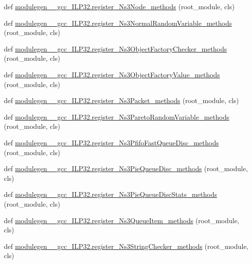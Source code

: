 \begin{DoxyCompactItemize}
\item 
def \hyperlink{namespacemodulegen____gcc__ILP32_a2500f4dcd70d582b086c6ce23502e83c}{modulegen\+\_\+\+\_\+gcc\+\_\+\+I\+L\+P32.\+register\+\_\+\+Ns3\+Node\+\_\+methods} (root\+\_\+module, cls)
\item 
def \hyperlink{namespacemodulegen____gcc__ILP32_a19dba5e985f333f3aaf4f9a23c36edad}{modulegen\+\_\+\+\_\+gcc\+\_\+\+I\+L\+P32.\+register\+\_\+\+Ns3\+Normal\+Random\+Variable\+\_\+methods} (root\+\_\+module, cls)
\item 
def \hyperlink{namespacemodulegen____gcc__ILP32_aee073757310c9de4d2861b5c4b4eee5c}{modulegen\+\_\+\+\_\+gcc\+\_\+\+I\+L\+P32.\+register\+\_\+\+Ns3\+Object\+Factory\+Checker\+\_\+methods} (root\+\_\+module, cls)
\item 
def \hyperlink{namespacemodulegen____gcc__ILP32_a7505caf7d909001e889b89ce94143f4a}{modulegen\+\_\+\+\_\+gcc\+\_\+\+I\+L\+P32.\+register\+\_\+\+Ns3\+Object\+Factory\+Value\+\_\+methods} (root\+\_\+module, cls)
\item 
def \hyperlink{namespacemodulegen____gcc__ILP32_ac954ddbcc06ada408c4168d841f1ac53}{modulegen\+\_\+\+\_\+gcc\+\_\+\+I\+L\+P32.\+register\+\_\+\+Ns3\+Packet\+\_\+methods} (root\+\_\+module, cls)
\item 
def \hyperlink{namespacemodulegen____gcc__ILP32_aeeb1ab9a764c8ee20760d96f553b05e6}{modulegen\+\_\+\+\_\+gcc\+\_\+\+I\+L\+P32.\+register\+\_\+\+Ns3\+Pareto\+Random\+Variable\+\_\+methods} (root\+\_\+module, cls)
\item 
def \hyperlink{namespacemodulegen____gcc__ILP32_aba73bf49253e822f77f5cb8ec55a6fc2}{modulegen\+\_\+\+\_\+gcc\+\_\+\+I\+L\+P32.\+register\+\_\+\+Ns3\+Pfifo\+Fast\+Queue\+Disc\+\_\+methods} (root\+\_\+module, cls)
\item 
def \hyperlink{namespacemodulegen____gcc__ILP32_a63727e2d9027ea9ce137bfd4a6c63af0}{modulegen\+\_\+\+\_\+gcc\+\_\+\+I\+L\+P32.\+register\+\_\+\+Ns3\+Pie\+Queue\+Disc\+\_\+methods} (root\+\_\+module, cls)
\item 
def \hyperlink{namespacemodulegen____gcc__ILP32_a4075de9ffa80bffa13ad25fdcbf5f290}{modulegen\+\_\+\+\_\+gcc\+\_\+\+I\+L\+P32.\+register\+\_\+\+Ns3\+Pie\+Queue\+Disc\+Stats\+\_\+methods} (root\+\_\+module, cls)
\item 
def \hyperlink{namespacemodulegen____gcc__ILP32_a0cd680ce971a7650a7ee1facaf147003}{modulegen\+\_\+\+\_\+gcc\+\_\+\+I\+L\+P32.\+register\+\_\+\+Ns3\+Queue\+Item\+\_\+methods} (root\+\_\+module, cls)
\item 
def \hyperlink{namespacemodulegen____gcc__ILP32_aa3a6728b427435532c05ff84082ec010}{modulegen\+\_\+\+\_\+gcc\+\_\+\+I\+L\+P32.\+register\+\_\+\+Ns3\+String\+Checker\+\_\+methods} (root\+\_\+module, cls)

\end{DoxyCompactItemize}
